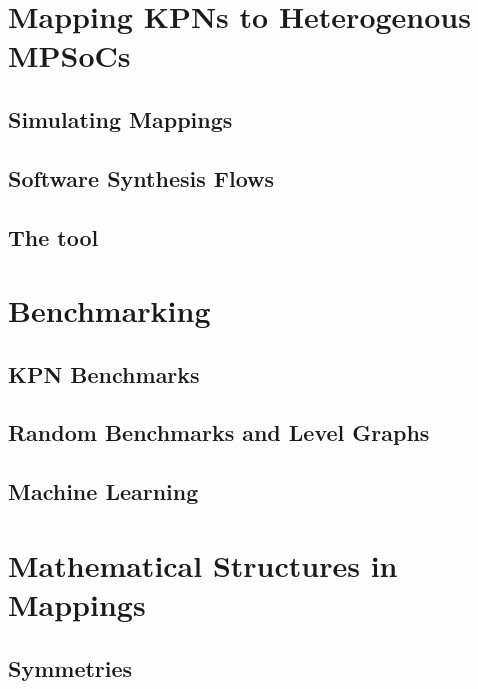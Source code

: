 \documentclass[
		twoside,openright,titlepage,numbers=noenddot,headinclude,%
	 	footinclude=true,cleardoublepage=empty,
		dottedtoc, %
		BCOR=5mm,paper=a4,fontsize=10pt, %
		ngerman,american, %
		]{scrreprt}
\begin{document}
%
\chapter{Mapping \acsp{KPN} to Heterogenous \acsp{MPSoC}}
\label{chap:mapping}


\section{Simulating Mappings}
\label{sec:simulating_mappings}

\section{Software Synthesis Flows}
\label{sec:software_synthesis_flows}

\section{The \mocasin tool}
\label{sec:mocasin}


\chapter{Benchmarking}
\label{chap:benchmarking}

\section{KPN Benchmarks}
\label{sec:kpn_benchmarks}

\section{Random Benchmarks and Level Graphs}
\label{sec:level_graphs}
\section{Machine Learning}
\label{sec:machine_learning}


\chapter{Mathematical Structures in Mappings}
\label{chap:mapping_structures}

\section{Symmetries}
\label{sec:symmetries}
\end{document}
